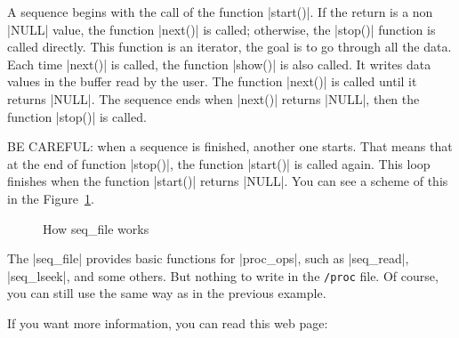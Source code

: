 \documentclass[10pt, oneside]{book}
\begin{document}
A sequence begins with the call of the function \cpp|start()|.
If the return is a non \cpp|NULL| value, the function \cpp|next()| is called; otherwise, the \cpp|stop()| function is called directly.
This function is an iterator, the goal is to go through all the data.
Each time \cpp|next()| is called, the function \cpp|show()| is also called.
It writes data values in the buffer read by the user.
The function \cpp|next()| is called until it returns \cpp|NULL|.
The sequence ends when \cpp|next()| returns \cpp|NULL|, then the function \cpp|stop()| is called.

BE CAREFUL: when a sequence is finished, another one starts.
That means that at the end of function \cpp|stop()|, the function \cpp|start()| is called again.
This loop finishes when the function \cpp|start()| returns \cpp|NULL|.
You can see a scheme of this in the Figure~\ref{img:seqfile}.

\begin{figure}[h]
  \center
  \caption{How seq\_file works}
  \label{img:seqfile}
\end{figure}

The \cpp|seq_file| provides basic functions for \cpp|proc_ops|, such as \cpp|seq_read|, \cpp|seq_lseek|, and some others.
But nothing to write in the \verb|/proc| file.
Of course, you can still use the same way as in the previous example.


If you want more information, you can read this web page:
\end{document}
